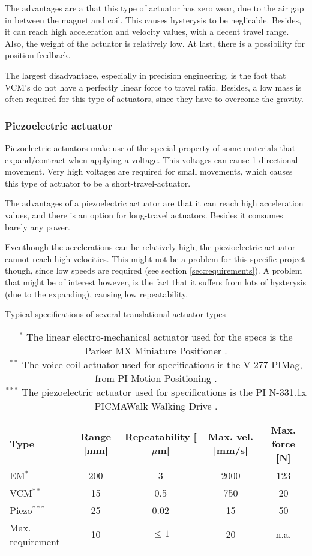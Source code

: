 The advantages are a that this type of actuator has zero wear, due to the air gap in between the magnet and coil. This causes hysterysis to be neglicable. Besides, it can reach high acceleration and velocity values, with a decent travel range. Also, the weight of the actuator is relatively low.  At last, there is a possibility for position feedback.

The largest disadvantage, especially in precision engineering, is the fact that VCM's do not have a perfectly linear force to travel ratio. Besides, a low mass is often required for this type of actuators, since they have to overcome the gravity.

\subsubsection*{Piezoelectric actuator}
Piezoelectric actuators make use of the special property of some materials that expand/contract when applying a voltage. This voltages can cause 1-directional movement. Very high voltages are required for small movements, which causes this type of actuator to be a short-travel-actuator.

The advantages of a piezoelectric actuator are that it can reach high acceleration values, and there is an option for long-travel actuators. Besides it consumes barely any power.

Eventhough the accelerations can be relatively high, the piezioelectric actuator cannot reach high velocities. This might not be a problem for this specific project though, since low speeds are required (see section \ref{sec:requirements}). A problem that might be of interest however, is the fact that it suffers from lots of hysterysis (due to the expanding), causing low repeatability.



\begin{table}[h] \centering \caption{Typical specifications of several translational actuator types} \label{tab:translationalactuators}
\begin{tabular}{l|cccc}
Type & Range [mm] & Repeatability [$\mu$m] & Max. vel. [mm/s] & Max. force [N] \\ \hline
EM$^{*}$            & 200 & 3 & 2000 & 123 \\
VCM$^{**}$          & 15 & 0.5 & 750 & 20 \\
Piezo$^{***}$       & 25 & 0.02 & 15 & 50 \\ \hline
Max. requirement    & 10 & $\leq 1$ & 20 & n.a.
\end{tabular}
\caption*{$^{*}$ The linear electro-mechanical actuator used for the specs is the Parker MX Miniature Positioner \cite{ElectromechanicalOverview}. \\ $^{**}$ The voice coil actuator used for specifications is the V-277 PIMag, from PI Motion Positioning \cite{V-277Actuator}. \\ $^{***}$ The piezoelectric actuator used for specifications is the PI N-331.1x PICMAWalk Walking Drive \cite{N-331Drive}.}
\end{table}





